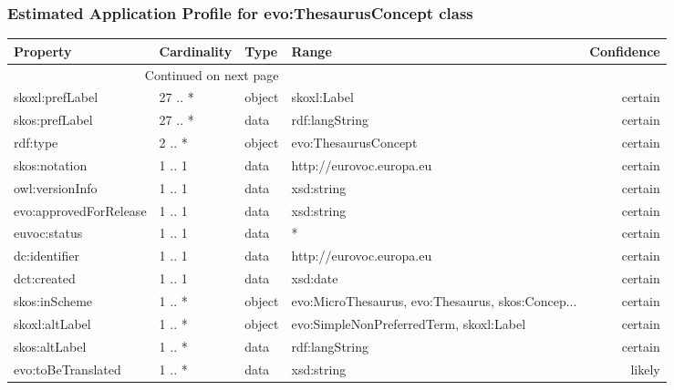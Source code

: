 \documentclass[10pt,a4paper,titlepage,final]{article}
\begin{document}
\subsubsection{Estimated Application Profile for evo:ThesaurusConcept class}
\begin{tabularx}{\textwidth}{lllXr}
\toprule
               Property & Cardinality &    Type &                                              Range & Confidence \\
\midrule
\endhead
\midrule
\multicolumn{3}{r}{{Continued on next page}} \\
\midrule
\endfoot

\bottomrule
\endlastfoot
        skoxl:prefLabel &     27 .. * &  object &                                        skoxl:Label &    certain \\
         skos:prefLabel &     27 .. * &    data &                                     rdf:langString &    certain \\
               rdf:type &      2 .. * &  object &                               evo:ThesaurusConcept &    certain \\
          skos:notation &      1 .. 1 &    data &                           http://eurovoc.europa.eu &    certain \\
        owl:versionInfo &      1 .. 1 &    data &                                         xsd:string &    certain \\
 evo:approvedForRelease &      1 .. 1 &    data &                                         xsd:string &    certain \\
           euvoc:status &      1 .. 1 &    data &                                                  * &    certain \\
          dc:identifier &      1 .. 1 &    data &                           http://eurovoc.europa.eu &    certain \\
            dct:created &      1 .. 1 &    data &                                           xsd:date &    certain \\
          skos:inScheme &      1 .. * &  object &  evo:MicroThesaurus, evo:Thesaurus, skos:Concep... &    certain \\
         skoxl:altLabel &      1 .. * &  object &            evo:SimpleNonPreferredTerm, skoxl:Label &    certain \\
          skos:altLabel &      1 .. * &    data &                                     rdf:langString &    certain \\
     evo:toBeTranslated &      1 .. * &    data &                                         xsd:string &     likely \\

\end{tabularx}
\end{document}
